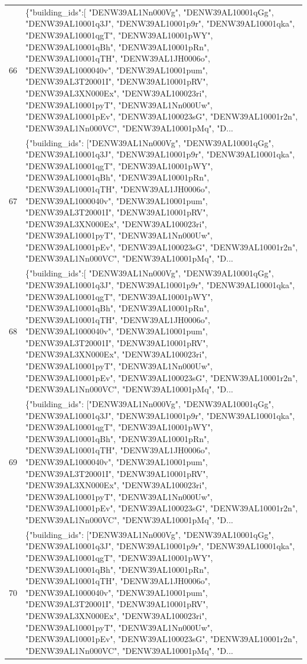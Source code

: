 \documentclass[a4paper,11pt]{article}
\begin{document}
\begin{table}[ht]
\begin{tabular}{r p{12cm}}
66 & \{"building\_ids":[ "DENW39AL1Nn000Vg", "DENW39AL10001qGg", "DENW39AL10001q3J", "DENW39AL10001p9r", "DENW39AL10001qka", "DENW39AL10001qgT", "DENW39AL10001pWY", "DENW39AL10001qBh", "DENW39AL10001pRn", "DENW39AL10001qTH", "DENW39AL1JH0006o", "DENW39AL1000040v", "DENW39AL10001pum", "DENW39AL3T20001I", "DENW39AL10001pRV", "DENW39AL3XN000Ex", "DENW39AL100023ri", "DENW39AL10001pyT", "DENW39AL1Nn000Uw", "DENW39AL10001pEv", "DENW39AL100023sG", "DENW39AL10001r2n", "DENW39AL1Nn000VC", "DENW39AL10001pMq", "D... \\
67 & \{"building\_ids": ["DENW39AL1Nn000Vg", "DENW39AL10001qGg", "DENW39AL10001q3J", "DENW39AL10001p9r", "DENW39AL10001qka", "DENW39AL10001qgT", "DENW39AL10001pWY", "DENW39AL10001qBh", "DENW39AL10001pRn", "DENW39AL10001qTH", "DENW39AL1JH0006o", "DENW39AL1000040v", "DENW39AL10001pum", "DENW39AL3T20001I", "DENW39AL10001pRV", "DENW39AL3XN000Ex", "DENW39AL100023ri", "DENW39AL10001pyT", "DENW39AL1Nn000Uw", "DENW39AL10001pEv", "DENW39AL100023sG", "DENW39AL10001r2n", "DENW39AL1Nn000VC", "DENW39AL10001pMq", "D... \\
68 & \{"building\_ids":[ "DENW39AL1Nn000Vg", "DENW39AL10001qGg", "DENW39AL10001q3J", "DENW39AL10001p9r", "DENW39AL10001qka", "DENW39AL10001qgT", "DENW39AL10001pWY", "DENW39AL10001qBh", "DENW39AL10001pRn", "DENW39AL10001qTH", "DENW39AL1JH0006o", "DENW39AL1000040v", "DENW39AL10001pum", "DENW39AL3T20001I", "DENW39AL10001pRV", "DENW39AL3XN000Ex", "DENW39AL100023ri", "DENW39AL10001pyT", "DENW39AL1Nn000Uw", "DENW39AL10001pEv", "DENW39AL100023sG", "DENW39AL10001r2n", "DENW39AL1Nn000VC", "DENW39AL10001pMq", "D... \\
69 & \{"building\_ids": ["DENW39AL1Nn000Vg", "DENW39AL10001qGg", "DENW39AL10001q3J", "DENW39AL10001p9r", "DENW39AL10001qka", "DENW39AL10001qgT", "DENW39AL10001pWY", "DENW39AL10001qBh", "DENW39AL10001pRn", "DENW39AL10001qTH", "DENW39AL1JH0006o", "DENW39AL1000040v", "DENW39AL10001pum", "DENW39AL3T20001I", "DENW39AL10001pRV", "DENW39AL3XN000Ex", "DENW39AL100023ri", "DENW39AL10001pyT", "DENW39AL1Nn000Uw", "DENW39AL10001pEv", "DENW39AL100023sG", "DENW39AL10001r2n", "DENW39AL1Nn000VC", "DENW39AL10001pMq", "D... \\
70 & \{"building\_ids": ["DENW39AL1Nn000Vg", "DENW39AL10001qGg", "DENW39AL10001q3J", "DENW39AL10001p9r", "DENW39AL10001qka", "DENW39AL10001qgT", "DENW39AL10001pWY", "DENW39AL10001qBh", "DENW39AL10001pRn", "DENW39AL10001qTH", "DENW39AL1JH0006o", "DENW39AL1000040v", "DENW39AL10001pum", "DENW39AL3T20001I", "DENW39AL10001pRV", "DENW39AL3XN000Ex", "DENW39AL100023ri", "DENW39AL10001pyT", "DENW39AL1Nn000Uw", "DENW39AL10001pEv", "DENW39AL100023sG", "DENW39AL10001r2n", "DENW39AL1Nn000VC", "DENW39AL10001pMq", "D... \\

\end{tabular}
\end{table}
\end{document}

